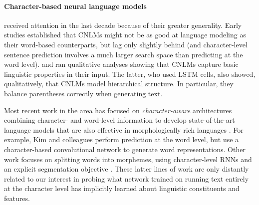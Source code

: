 \paragraph{Character-based neural language models} received attention in the last
decade because of their greater generality. %
Early studies
\cite{Mikolov:etal:2011,Sutskever:etal:2011,DBLP:journals/corr/Graves13}
established that CNLMs might not be as good at language modeling as
their word-based counterparts, but lag only slightly behind (and
character-level sentence prediction involves a much larger search
space than predicting at the word
level).  and
 ran qualitative analyses showing
that CNLMs capture basic linguistic properties in their input. The
latter, who used LSTM cells, also showed, qualitatively, that CNLMs model
hierarchical structure. In particular, they balance parentheses
correctly when generating text. %

Most recent work in the area has focused on \emph{character-aware}
architectures combining character- and word-level information to
develop state-of-the-art language models that are also effective in
morphologically rich languages
\citep[e.g.,][]{Bojanowski:etal:2016,Kim:etal:2016,Gerz:etal:2018}. For
example, Kim and colleagues perform prediction at the word level, but
use a character-based convolutional network to generate word
representations. Other work focuses on splitting words into morphemes,
using character-level RNNs and an explicit segmentation objective
\cite[e.g.,][]{Kann:etal:2016}. These latter lines of work are only
distantly related to our interest in probing what network trained on
running text entirely at the character level has implicitly learned about
linguistic constituents and features.


